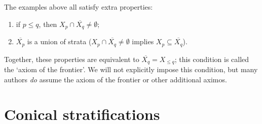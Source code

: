 \begin{rmk}
The examples above all satisfy extra properties:
\begin{enumerate}
\item if \(p\leq q\), then \(X_p\cap\overline{X_q}\neq\emptyset\);
\item \(\overline{X_p}\) is a union of strata (\(X_p\cap\overline{X_q}\neq\emptyset\) implies \(X_p\subseteq\overline{X_q}\)).
\end{enumerate}
Together, these properties are equivalent to \(\overline{X_q}=X_{\leq q}\); this condition is called the `axiom of the frontier'.
We will not explicitly impose this condition, but many authors \emph{do} assume the axiom of the frontier or other additional aximos.
\end{rmk}


\section{Conical stratifications}

